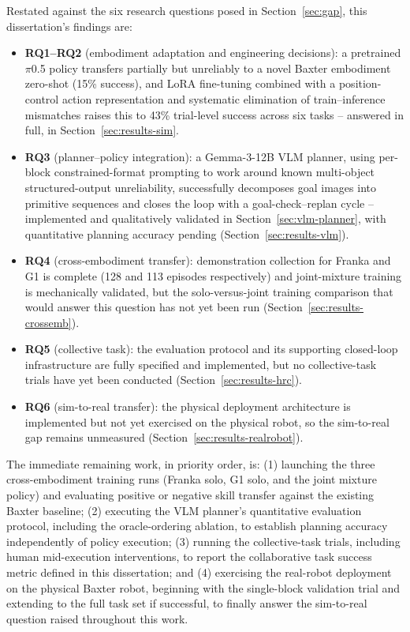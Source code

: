 \documentclass[12pt]{article}
\begin{document}
Restated against the six research questions posed in Section~\ref{sec:gap}, this dissertation's findings are:
\begin{itemize}[nosep]
\item \textbf{RQ1--RQ2} (embodiment adaptation and engineering decisions): a pretrained $\pi$0.5 policy transfers partially but unreliably to a novel Baxter embodiment zero-shot (15\% success), and LoRA fine-tuning combined with a position-control action representation and systematic elimination of train--inference mismatches raises this to 43\% trial-level success across six tasks -- answered in full, in Section~\ref{sec:results-sim}.
\item \textbf{RQ3} (planner--policy integration): a Gemma-3-12B VLM planner, using per-block constrained-format prompting to work around known multi-object structured-output unreliability, successfully decomposes goal images into primitive sequences and closes the loop with a goal-check--replan cycle -- implemented and qualitatively validated in Section~\ref{sec:vlm-planner}, with quantitative planning accuracy pending (Section~\ref{sec:results-vlm}).
\item \textbf{RQ4} (cross-embodiment transfer): demonstration collection for Franka and G1 is complete (128 and 113 episodes respectively) and joint-mixture training is mechanically validated, but the solo-versus-joint training comparison that would answer this question has not yet been run (Section~\ref{sec:results-crossemb}).
\item \textbf{RQ5} (collective task): the evaluation protocol and its supporting closed-loop infrastructure are fully specified and implemented, but no collective-task trials have yet been conducted (Section~\ref{sec:results-hrc}).
\item \textbf{RQ6} (sim-to-real transfer): the physical deployment architecture is implemented but not yet exercised on the physical robot, so the sim-to-real gap remains unmeasured (Section~\ref{sec:results-realrobot}).
\end{itemize}

The immediate remaining work, in priority order, is: (1) launching the three cross-embodiment training runs (Franka solo, G1 solo, and the joint mixture policy) and evaluating positive or negative skill transfer against the existing Baxter baseline; (2) executing the VLM planner's quantitative evaluation protocol, including the oracle-ordering ablation, to establish planning accuracy independently of policy execution; (3) running the collective-task trials, including human mid-execution interventions, to report the collaborative task success metric defined in this dissertation; and (4) exercising the real-robot deployment on the physical Baxter robot, beginning with the single-block validation trial and extending to the full task set if successful, to finally answer the sim-to-real question raised throughout this work.
\end{document}
